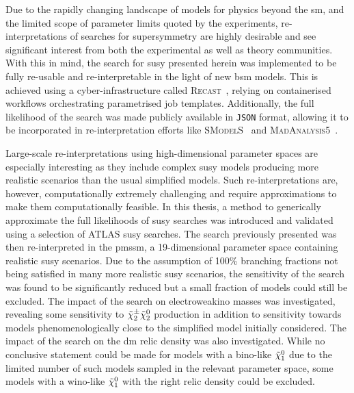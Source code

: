 Due to the rapidly changing landscape of models for physics beyond the \gls{sm}, and the limited scope of parameter limits quoted by the experiments, re-interpretations of searches for supersymmetry are highly desirable and see significant interest from both the experimental as well as theory communities. With this in mind, the search for \gls{susy} presented herein was implemented to be fully re-usable and re-interpretable in the light of new \gls{bsm} models. This is achieved using a cyber-infrastructure called \textsc{Recast}~\cite{RECAST_cranmer}, relying on containerised workflows orchestrating parametrised job templates. Additionally, the full likelihood of the search was made publicly available in \texttt{JSON} format, allowing it to be incorporated in re-interpretation efforts like \textsc{SModelS}~\cite{SModelS1:2013mwa,SModelS2:2017neo} and \textsc{MadAnalysis5}~\cite{Goodsell:2020ddr,Fuks:2021wpe}. 
 
Large-scale re-interpretations using high-dimensional parameter spaces are especially interesting as they include complex \gls{susy} models producing more realistic scenarios than the usual simplified models. Such re-interpretations are, however, computationally extremely challenging and require approximations to make them computationally feasible. In this thesis, a method to generically approximate the full likelihoods of \gls{susy} searches was introduced and validated using a selection of ATLAS \gls{susy} searches. The search previously presented was then re-interpreted in the \gls{pmssm}, a 19-dimensional parameter space containing realistic \gls{susy} scenarios. Due to the assumption of 100\% branching fractions not being satisfied in many more realistic \gls{susy} scenarios, the sensitivity of the \onelepton search was found to be significantly reduced but a small fraction of models could still be excluded. The impact of the \onelepton search on electroweakino masses was investigated, revealing some sensitivity to $\tilde{\chi}_2^\pm\tilde{\chi}_2^0$ production in addition to sensitivity towards models phenomenologically close to the simplified model initially considered. The impact of the \onelepton search on the \gls{dm} relic density was also investigated. While no conclusive statement could be made for models with a bino-like $\tilde{\chi}_1^0$ due to the limited number of such models sampled in the relevant parameter space, some models with a wino-like $\tilde{\chi}_1^0$ with the right relic density could be excluded. 
 
